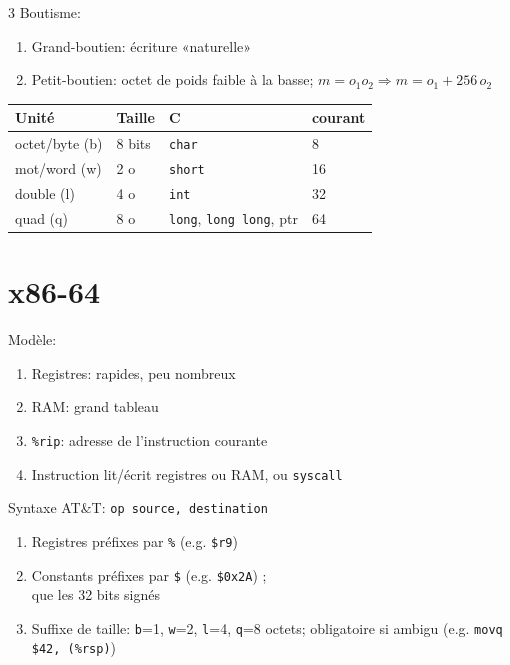 \documentclass[12pt, a4paper]{article}
\begin{document}
\begin{multicols*}{3}
	Boutisme:
	\begin{enumerate}[\roman*.]
		\item Grand-boutien: écriture «naturelle»
		\item Petit-boutien: octet de poids faible à la basse; $m=o_1o_2 \Rightarrow m=o_1+256\,o_2$
	\end{enumerate}
	\vspace{1em}
	\begin{tabular}{|l|l|l|l|}
		\hline
		\textbf{Unité} & \textbf{Taille} & \textbf{C}                             & \textbf{courant} \\
		\hline
		octet/byte (b) & 8 bits          & \texttt{char}                          & 8                \\
		mot/word (w)   & 2 o             & \texttt{short}                         & 16               \\
		double (l)     & 4 o             & \texttt{int}                           & 32               \\
		quad (q)       & 8 o             & \texttt{long}, \texttt{long long}, ptr & 64               \\
		\hline
	\end{tabular}

	\section{x86-64}
	\lstset{style=asm}
	Modèle:
	\begin{enumerate}[\roman*.]
		\item Registres: rapides, peu nombreux
		\item RAM: grand tableau
		\item \lstinline|%rip|: adresse de l'instruction courante
		\item Instruction lit/écrit registres ou RAM, ou \lstinline|syscall|
	\end{enumerate}

	Syntaxe AT\&T: \lstinline|op source, destination|
	\begin{enumerate}[\roman*.]
		\item Registres préfixes par \lstinline|%| (e.g. \lstinline|$r9|)
		\item Constants préfixes par \lstinline|$| (e.g. \lstinline|$0x2A|) ;\\que les 32 bits signés
		\item Suffixe de taille: \lstinline|b|=1, \lstinline|w|=2, \lstinline|l|=4, \lstinline|q|=8 octets; obligatoire si ambigu (e.g. \lstinline|movq $42, (%rsp)|)
	\end{enumerate}


\end{multicols*}
\end{document}
